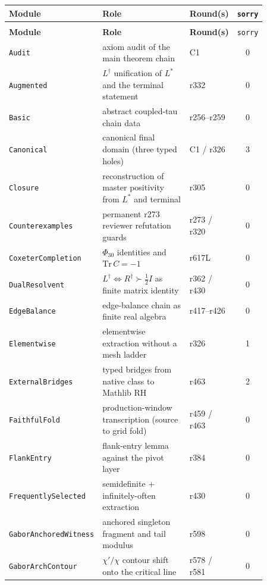 \documentclass[11pt]{article}
\theoremstyle{definition}
\theoremstyle{remark}
\begin{document}
\begingroup\small
\begin{longtable}{@{}
  >{\raggedright\arraybackslash}p{0.28\linewidth}
  >{\raggedright\arraybackslash}p{0.40\linewidth}
  >{\raggedright\arraybackslash}p{0.18\linewidth}
  c@{}}
\toprule
\textbf{Module} & \textbf{Role} & \textbf{Round(s)} & \texttt{sorry}\\
\midrule
\endfirsthead
\multicolumn{4}{c}{\small\itshape Complete Lean module inventory (continued)}\\
\toprule
\textbf{Module} & \textbf{Role} & \textbf{Round(s)} & \texttt{sorry}\\
\midrule
\endhead
\texttt{Audit} & axiom audit of the main theorem chain & C1 & 0\\
\texttt{Augmented} & $L^{\dagger}$ unification of $L^*$ and the terminal statement & r332 & 0\\
\texttt{Basic} & abstract coupled-tau chain data & r256--r259 & 0\\
\texttt{Canonical} & canonical final domain (three typed holes) & C1 / r326 & 3\\
\texttt{Closure} & reconstruction of master positivity from $L^*$ and terminal & r305 & 0\\
\texttt{Counterexamples} & permanent r273 reviewer refutation guards & r273 / r320 & 0\\
\texttt{CoxeterCompletion} & $\Phi_{30}$ identities and $\mathrm{Tr}\,C=-1$ & r617L & 0\\
\texttt{DualResolvent} & $L^{\dagger}\Leftrightarrow R^{\dagger}\succ\tfrac12 I$ as finite matrix identity & r362 / r430 & 0\\
\texttt{EdgeBalance} & edge-balance chain as finite real algebra & r417--r426 & 0\\
\texttt{Elementwise} & elementwise extraction without a mesh ladder & r326 & 1\\
\texttt{ExternalBridges} & typed bridges from native class to Mathlib RH & r463 & 2\\
\texttt{FaithfulFold} & production-window transcription (source to grid fold) & r459 / r463 & 0\\
\texttt{FlankEntry} & flank-entry lemma against the pivot layer & r384 & 0\\
\texttt{FrequentlySelected} & semidefinite $+$ infinitely-often extraction & r430 & 0\\
\texttt{GaborAnchoredWitness} & anchored singleton fragment and tail modulus & r598 & 0\\
\texttt{GaborArchContour} & $\chi'/\chi$ contour shift onto the critical line & r578 / r581 & 0\\

\end{longtable}
\end{document}
